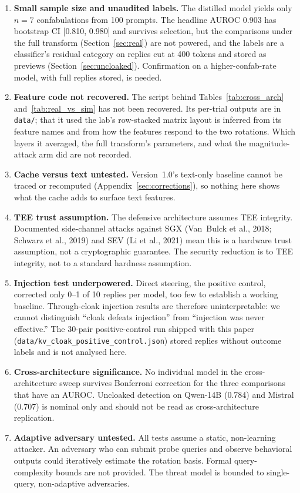 \documentclass[11pt,a4paper]{article}
\begin{document}
\begin{enumerate}
\item \textbf{Small sample size and unaudited labels.} The distilled
model yields only $n=7$ confabulations from 100 prompts. The headline
AUROC 0.903 has bootstrap CI [0.810, 0.980] and survives selection, but
the comparisons under the full transform (Section~\ref{sec:real}) are not
powered, and the labels are a classifier's residual category on replies
cut at 400 tokens and stored as previews (Section~\ref{sec:uncloaked}).
Confirmation on a higher-confab-rate model, with full replies stored, is
needed.

\item \textbf{Feature code not recovered.} The script behind
Tables~\ref{tab:cross_arch} and~\ref{tab:real_vs_sim} has not been
recovered. Its per-trial outputs are in \texttt{data/}; that it used the
lab's row-stacked matrix layout is inferred from its feature names and
from how the features respond to the two rotations. Which layers it
averaged, the full transform's parameters, and what the magnitude-attack
arm did are not recorded.

\item \textbf{Cache versus text untested.} Version~1.0's text-only
baseline cannot be traced or recomputed (Appendix~\ref{sec:corrections}), so nothing here
shows what the cache adds to surface text features.

\item \textbf{TEE trust assumption.} The defensive architecture assumes
TEE integrity. Documented side-channel attacks against SGX
(Van~Bulck et al., 2018; Schwarz et al., 2019) and SEV
(Li et al., 2021) mean this is a hardware trust assumption, not a
cryptographic guarantee. The security reduction is to TEE integrity,
not to a standard hardness assumption.

\item \textbf{Injection test underpowered.} Direct steering, the
positive control, corrected only 0--1 of 10 replies per model, too few to
establish a working baseline. Through-cloak injection results are
therefore uninterpretable: we cannot distinguish ``cloak defeats
injection'' from ``injection was never effective.'' The 30-pair
positive-control run shipped with this paper
(\nolinkurl{data/kv_cloak_positive_control.json}) stored replies without
outcome labels and is not analysed here.

\item \textbf{Cross-architecture significance.} No individual model in
the cross-architecture sweep survives Bonferroni correction for the three
comparisons that have an AUROC. Uncloaked detection on Qwen-14B (0.784)
and Mistral (0.707) is nominal only and should not be read as
cross-architecture replication.

\item \textbf{Adaptive adversary untested.} All tests assume a static,
non-learning attacker. An adversary who can submit probe queries and
observe behavioral outputs could iteratively estimate the rotation
basis. Formal query-complexity bounds are not provided. The threat model
is bounded to single-query, non-adaptive adversaries.
\end{enumerate}
\end{document}
